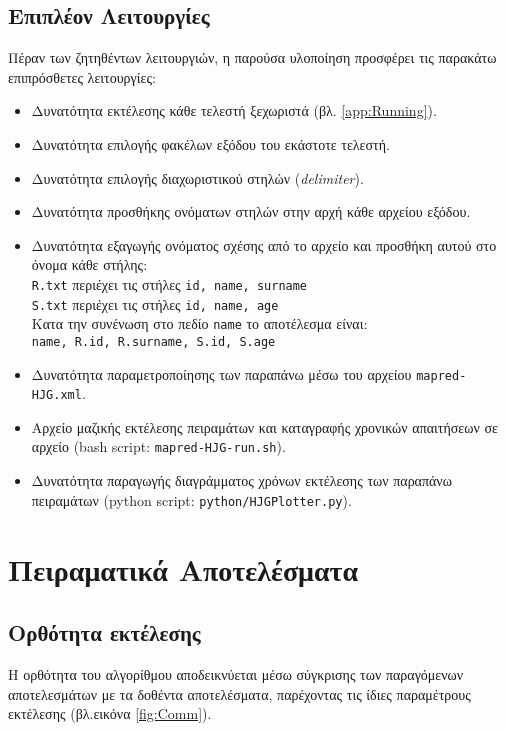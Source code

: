 \documentclass{article}
\newcommand{\en}[1]{\foreignlanguage{english}{#1}}
\begin{document}
\subsection{Επιπλέον Λειτουργίες} \label{subsec:Extras}

Πέραν των ζητηθέντων λειτουργιών, η παρούσα υλοποίηση προσφέρει τις παρακάτω επιπρόσθετες λειτουργίες:
\begin{itemize}
\item Δυνατότητα εκτέλεσης κάθε τελεστή ξεχωριστά (βλ. \ref{app:Running}).
\item Δυνατότητα επιλογής φακέλων εξόδου του εκάστοτε τελεστή.
\item Δυνατότητα επιλογής διαχωριστικού στηλών (\emph{\en{delimiter}}).
\item Δυνατότητα προσθήκης ονόματων στηλών στην αρχή κάθε αρχείου εξόδου.
\item Δυνατότητα εξαγωγής ονόματος σχέσης από το αρχείο και προσθήκη αυτού στο όνομα κάθε στήλης: \\ \texttt{\en{R.txt}} περιέχει τις στήλες \texttt{\en{id, name, surname}} \\
 \texttt{\en{S.txt}} περιέχει τις στήλες \texttt{\en{id, name, age}} \\
 Κατα την συνένωση στο πεδίο \texttt{\en{name}} το αποτέλεσμα είναι:\\
  \texttt{\en{name, R.id, R.surname, S.id, S.age}}
\item Δυνατότητα παραμετροποίησης των παραπάνω μέσω του αρχείου \texttt{\en{mapred-HJG.xml}}.
\item Αρχείο μαζικής εκτέλεσης πειραμάτων και καταγραφής χρονικών απαιτήσεων σε αρχείο (\en{bash script}: \texttt{\en{mapred-HJG-run.sh}}).
\item Δυνατότητα παραγωγής διαγράμματος χρόνων εκτέλεσης των παραπάνω πειραμάτων (\en{python script}: \texttt{\en{python/HJGPlotter.py}}).
\end{itemize}
\section{Πειραματικά Αποτελέσματα} \label{sec:ExpRes}
\subsection{Ορθότητα εκτέλεσης} \label{subsec:Corr}
Η ορθότητα του αλγορίθμου αποδεικνύεται μέσω σύγκρισης των παραγόμενων αποτελεσμάτων με τα δοθέντα αποτελέσματα, παρέχοντας τις ίδιες παραμέτρους εκτέλεσης (βλ.εικόνα \ref{fig:Comm}).
\end{document}
